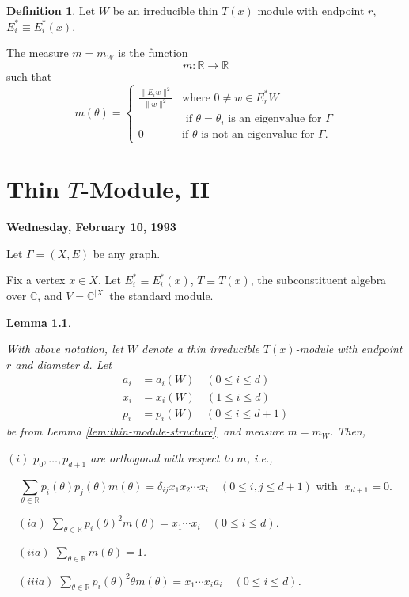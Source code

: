 \documentclass[
]{book}
\newtheorem{lemma}{Lemma}[chapter]
\theoremstyle{definition}
\newtheorem{definition}{Definition}[chapter]
\theoremstyle{definition}
\theoremstyle{definition}
\theoremstyle{definition}
\theoremstyle{remark}
\begin{document}
\begin{definition}
Let \(W\) be an irreducible thin \(T(x)\) module with endpoint \(r\), \(E^*_i \equiv E_i^*(x)\).

The measure  \(m = m_W\) is the function
\[m: \mathbb{R} \to \mathbb{R}\]
such that
\[
m(\theta) = \begin{cases}\frac{\|E_iw\|^2}{\|w\|^2} & \text{where } 0\neq w \in E^*_rW\\
& \text{ if $\theta = \theta_i$ is an eigenvalue for $\Gamma$}\\
0 & \text{if $\theta$ is not an eigenvalue for $\Gamma$.}
\end{cases}\]
\end{definition}

\hypertarget{lec10}{%
\chapter{\texorpdfstring{Thin \(T\)-Module, II}{Thin T-Module, II}}\label{lec10}}

\textbf{Wednesday, February 10, 1993}

Let \(\Gamma = (X, E)\) be any graph.

Fix a vertex \(x\in X\). Let \(E^*_i \equiv E^*_i(x)\), \(T\equiv T(x)\), the subconstituent algebra over \(\mathbb{C}\), and \(V = \mathbb{C}^{|X|}\) the standard module.

\begin{lemma}
\protect\hypertarget{lem:orthogonality}{}\label{lem:orthogonality}

With above notation, let \(W\) denote a thin irreducible \(T(x)\)-module with endpoint \(r\) and diameter \(d\). Let
\begin{align}
a_i & = a_i(W) \quad (0\leq i \leq d)\\
x_i & = x_i(W) \quad (1\leq i \leq d)\\
p_i & = p_i(W) \quad (0\leq i \leq d+1)
\end{align}
be from Lemma \ref{lem:thin-module-structure}, and measure \(m = m_W\).
Then,

\((i)\) \(p_0, \ldots, p_{d+1}\) are orthogonal with respect to \(m\), i.e.,

\[\sum_{\theta\in \mathbb{R}}p_i(\theta)p_j(\theta)m(\theta) = \delta_{ij}x_1x_2\cdots x_i \quad (0\leq i,j\leq d+1) \text{ with }\; x_{d+1}=0.\]

\(\quad (ia)\) \({\displaystyle \sum_{\theta\in \mathbb{R}}p_i(\theta)^2m(\theta) = x_1\cdots x_i \quad (0\leq i\leq d)}\).

\(\quad (iia)\) \({\displaystyle \sum_{\theta\in \mathbb{R}}m(\theta) = 1}\).

\(\quad (iiia)\) \({\displaystyle \sum_{\theta\in \mathbb{R}}p_i(\theta)^2\theta m(\theta) = x_1\cdots x_ia_i \quad (0\leq i\leq d)}\).

\end{lemma}
\end{document}
